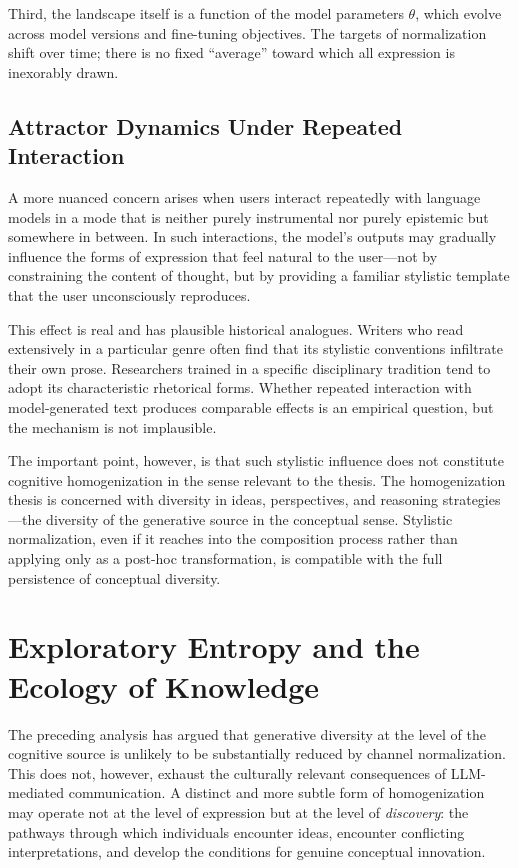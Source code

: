 \documentclass[12pt,a4paper]{article}
\theoremstyle{definition}
\theoremstyle{plain}
\theoremstyle{remark}
\begin{document}
Third, the landscape itself is a function of the model parameters $\theta$, which evolve
across model versions and fine-tuning objectives. The targets of normalization shift over
time; there is no fixed ``average'' toward which all expression is inexorably drawn.

\subsection{Attractor Dynamics Under Repeated Interaction}

A more nuanced concern arises when users interact repeatedly with language models in a mode
that is neither purely instrumental nor purely epistemic but somewhere in between. In such
interactions, the model's outputs may gradually influence the forms of expression that feel
natural to the user---not by constraining the content of thought, but by providing a familiar
stylistic template that the user unconsciously reproduces.

This effect is real and has plausible historical analogues. Writers who read extensively in a
particular genre often find that its stylistic conventions infiltrate their own prose.
Researchers trained in a specific disciplinary tradition tend to adopt its characteristic
rhetorical forms. Whether repeated interaction with model-generated text produces comparable
effects is an empirical question, but the mechanism is not implausible.

The important point, however, is that such stylistic influence does not constitute cognitive
homogenization in the sense relevant to the thesis. The homogenization thesis is concerned
with diversity in ideas, perspectives, and reasoning strategies---the diversity of the
generative source in the conceptual sense. Stylistic normalization, even if it reaches into
the composition process rather than applying only as a post-hoc transformation, is compatible
with the full persistence of conceptual diversity.

\section{Exploratory Entropy and the Ecology of Knowledge}
\label{sec:exploratory}

The preceding analysis has argued that generative diversity at the level of the cognitive
source is unlikely to be substantially reduced by channel normalization. This does not,
however, exhaust the culturally relevant consequences of LLM-mediated communication. A
distinct and more subtle form of homogenization may operate not at the level of expression
but at the level of \emph{discovery}: the pathways through which individuals encounter ideas,
encounter conflicting interpretations, and develop the conditions for genuine conceptual
innovation.
\end{document}
